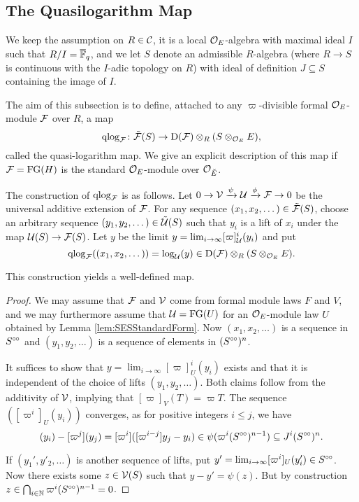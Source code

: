 \documentclass[../main.tex]{subfiles}
\begin{document}

\subsection{The Quasilogarithm Map} %
\label{sub:The Quasilogarithm map}
We keep the assumption on $R \in \mathcal{C}$, it is a local ${\mathcal{O}_E}$-algebra with maximal
ideal $I$ such that $R/I = {\overline {\mathbb{F}}_q}$, and we let
$S$ denote an admissible $R$-algebra (where $R \to S$ is continuous with
the $I$-adic topology on $R$) with ideal of definition $J \subseteq S$ containing
the image of $I$. 

The aim of this subsection is to define, attached to any $\varpi$-divisible formal
${\mathcal{O}_E}$-module $\mathcal{F}$ over $R$, a map
\begin{equation*}
  \mathrm{qlog}_{\mathcal{F}}\colon \tilde {\mathcal{F}}(S) \to \mathrm{D}(\mathcal{F}) \otimes_R (S \otimes_{\mathcal{O}_E} E),
\end{equation*}
called the quasi-logarithm map.
We give an explicit description of this map if $\mathcal{F} = \textnormal{FG}(H)$ is the standard
$\mathcal{O}_E$-module over $\mathcal{O}_{\breve E}$. 

The construction of $\mathrm{qlog}_{\mathcal{F}}$ is as follows.  
Let $0 \to \mathcal{V} \xrightarrow{\psi} \mathcal{U} \xrightarrow{\phi} \mathcal{F} \to 0$ be the universal additive
extension of $\mathcal{F}$. For any sequence $(x_1, x_2, \dots) \in \tilde {\mathcal{F}}(S)$, choose an arbitrary sequence $(y_1, y_2, \dots) \in
\tilde {\mathcal{U}}(S)$ such that $y_i$ is a lift of $x_i$ under the map $\mathcal{U}(S) \to \mathcal{F}(S)$. 
Let $y$ be the limit $y = \lim_{i \to \infty} [\varpi]_{\mathcal{U}}^i(y_i)$ and put 
$$\mathrm{qlog}_{\mathcal{F}}((x_1, x_2, \dots)) = \log_{\mathcal{U}}(y) \in \mathrm{D}(\mathcal{F}) \otimes_R(S \otimes_{\mathcal{O}_E} E).$$ 

\begin{prop}
  This construction yields a well-defined map. 
\begin{proof}
  We may assume that $\mathcal{F}$ and $\mathcal{V}$ come from formal module laws $F$ and 
  $V$, and we may furthermore assume that $\mathcal{U} = \textnormal{FG}(U)$ 
  for an $\mathcal{O}_E$-module law $U$ obtained by Lemma \ref{lem:SESStandardForm}. Now
  $(x_1, x_2, \dots)$ is a sequence in $S^{\circ \hspace{-0.5pt} \circ}$ and $(y_1, y_2, \dots)$ is a
  sequence of elements in $(S^{\circ \hspace{-0.5pt} \circ})^n$.

  It suffices to show that $y = \lim_{i\to \infty} [\varpi]^i_U(y_i)$ exists and 
  that it is independent of the choice of lifts $(y_1, y_2, \dots)$. 
  Both claims follow from the additivity of $\mathcal{V}$, implying that 
  $[\varpi]_{V}(T) = \varpi T$. The sequence 
  $([\varpi^i]_{U}(y_i))$ converges, as for positive integers $i\leq j$, we have 
  \begin{equation*}
    [\varpi^i](y_i) - [\varpi^j](y_j) = [\varpi^i]([\varpi^{i-j}]y_j - y_i)
    \in \psi(\varpi^i (S^\cici)^{n-1}) \subseteq J^i (S^\cici)^{n}. 
  \end{equation*}

  If $(y_1', y'_2, \dots)$ is another sequence of lifts, put
  $y' = \lim_{i \to \infty} [\varpi^i]_U (y_i') \in S^{\circ \hspace{-0.5pt} \circ}$. Now there exists some
  $z \in \mathcal{V}(S)$ such that 
  $y - y' = \psi(z)$. But by construction
  $z \in \bigcap_{i \in \mathbb{N}} \varpi^i(S^{{\circ \hspace{-0.5pt} \circ}})^{n-1} = 0$.
\end{proof}
\end{prop}
\end{document}
